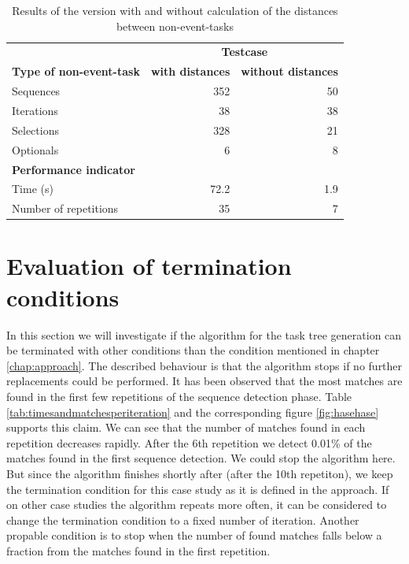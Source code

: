 \begin{table}[h]
	\centering
	\begin{tabular}{l r r}
		\toprule
		&  \multicolumn{2}{c}{\textbf{Testcase}} \\
		\cmidrule{2-3}
		\textbf{Type of non-event-task}& \textbf{with distances}& \textbf{without distances} \\
		\midrule
		Sequences & 352 & 50 \\
		Iterations& 38  & 38 \\
		Selections& 328 & 21 \\
		Optionals & 6   & 8  \\
		\midrule
		\textbf{Performance indicator} & \\
		\midrule
		Time (s)     & 72.2 & 1.9 \\
		Number of repetitions & 35 & 7\\
		\bottomrule
	\end{tabular}
	\caption{Results of the version with and without calculation of the distances between non-event-tasks}
	\label{tab:resultsnoneventtasks}
\end{table}

\section{Evaluation of termination conditions}
In this section we will investigate if the algorithm for the task tree generation can be terminated with other conditions than the condition mentioned in chapter \ref{chap:approach}.
The described behaviour is that the algorithm stops if no further replacements could be performed.
It has been observed that the most matches are found in the first few repetitions of the sequence detection phase.
Table \ref{tab:timesandmatchesperiteration} and the corresponding figure \ref{fig:hasehase} supports this claim. We can see that the number of matches found in each repetition decreases rapidly.
After the 6th repetition we detect 0.01\% of the matches found in the first sequence detection. We could stop the algorithm here. But since the algorithm finishes shortly after (after the 10th repetiton),
we keep the termination condition for this case study as it is defined in the approach.
If on other case studies the algorithm repeats more often, it can be considered to change the termination condition to a fixed number of iteration.
Another propable condition is to stop when the number of found matches falls below a fraction from the matches found in the first repetition.

